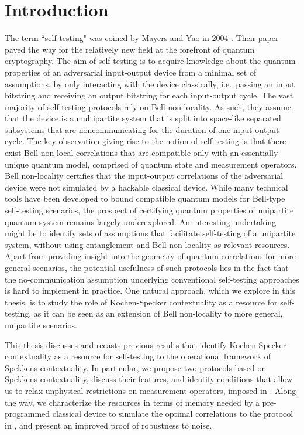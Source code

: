 \chapter{Introduction}
The term ``self-testing" was coined by Mayers and Yao in 2004 \cite{Mayers2003}. Their paper paved the way for the relatively new field at the forefront of quantum cryptography. The aim of self-testing is to acquire knowledge about the quantum properties of an adversarial input-output device from a minimal set of assumptions, by only interacting with the device classically, i.e.\ passing an input bitstring and receiving an output bitstring for each input-output cycle. The vast majority of self-testing protocols rely on Bell non-locality. As such, they assume that the device is a multipartite system that is split into space-like separated subsystems that are noncommunicating for the duration of one input-output cycle. The key observation giving rise to the notion of self-testing is that there exist Bell non-local correlations that are compatible only with an essentially unique quantum model, comprised of quantum state and measurement operators. Bell non-locality certifies that the input-output correlations of the adversarial device were not simulated by a hackable classical device. While
many technical tools have been developed to bound compatible quantum models for Bell-type self-testing scenarios, the prospect of certifying quantum properties of unipartite quantum system remains largely underexplored. An interesting undertaking might be to identify sets of assumptions that facilitate self-testing of a unipartite system, without using entanglement and Bell non-locality as relevant resources. Apart from providing insight into the geometry of quantum correlations for more general scenarios, the potential usefulness of such protocols lies in the fact that the no-communication assumption underlying conventional self-testing approaches is hard to implement in practice. One natural approach, which we explore in this thesis, is to study the role of Kochen-Specker contextuality as a resource for self-testing, as it can be seen as an extension of Bell non-locality to more general, unipartite scenarios. 

This thesis discusses and recasts previous results \cite{Bharti2019} that identify Kochen-Specker contextuality as a resource for self-testing to the operational framework of Spekkens contextuality. In particular, we propose two protocols based on Spekkens contextuality, discuss their features, and identify conditions that allow us to relax unphysical restrictions on measurement operators, imposed in \cite{Bharti2019}. Along the way, we characterize the resources in terms of memory needed by a pre-programmed classical device to simulate the optimal correlations to the protocol in \cite{Bharti2019}, and present an improved proof of robustness to noise.

